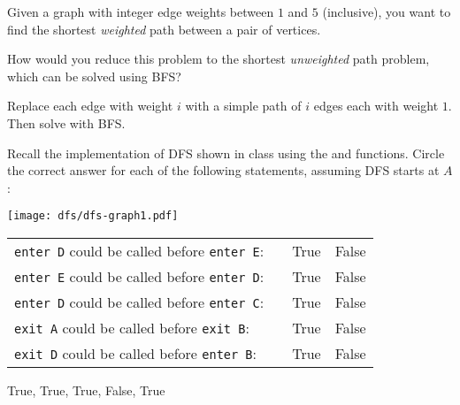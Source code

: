 %

\begin{problem}

Given a graph with integer edge weights between $1$ and $5$
(inclusive), you want to find the shortest \emph{weighted} path
between a pair of vertices. 

\ask
How would you reduce this problem to the
shortest \emph{unweighted} path problem, which can be solved using
BFS?

\sol
Replace each edge with weight $i$ with a simple path of $i$ edges
each with weight $1$. Then solve with BFS.

\end{problem}

%
\begin{problem}

Recall the implementation of DFS shown in class using the 
and  functions. Circle the correct answer for each of the
following statements, assuming DFS starts at $A$:

\begin{center}
  \texttt{[image: dfs/dfs-graph1.pdf]}
\end{center}

\bigskip
  \begin{tabular}{lp{1.3in}cc}
    \texttt{enter D} could be called before \texttt{enter E}:& &
    \textsf{True} & \textsf{False}\\[1.5 ex]
    \texttt{enter E} could be called before \texttt{enter D}:& & \textsf{True} & \textsf{False}\\[1.5 ex]
    \texttt{enter D} could be called before \texttt{enter C}:& & \textsf{True} & \textsf{False}\\[1.5 ex]
    \texttt{exit A} could be called before \texttt{exit B}: & & \textsf{True} & \textsf{False}\\[1.5 ex]
    \texttt{exit D} could be called before \texttt{enter B}:&  & \textsf{True} & \textsf{False}
  \end{tabular}

\sol
    True, True, True, False, True
\end{problem}

%

